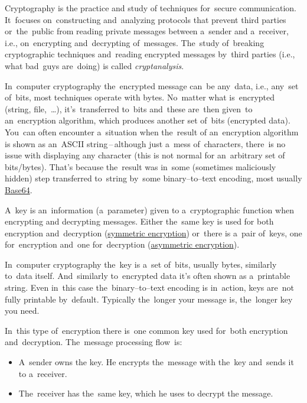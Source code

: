 Cryptography is the practice and study of techniques for~secure communication. It~focuses on~constructing and~analyzing protocols that prevent third parties or~the~public from reading private messages between a~sender and a~receiver, i.e., on~encrypting and~decrypting of~messages. The~study of~breaking cryptographic techniques and~reading encrypted messages by~third parties (i.e., what bad~guys are~doing) is called \textit{cryptanalysis}.

In~computer cryptography the~encrypted message can~be any~data, i.e., any~set of~bits, most techniques operate with bytes. No~matter what is~encrypted (string, file,~\dots), it's~transferred to~bits and~these are~then given~to an~encryption algorithm, which produces another set of~bits (encrypted data). You~can often encounter a~situation when the~result of an~encryption algorithm is shown as an~ASCII string\,--\,although just a~mess of~characters, there~is no issue with displaying any character (this is not normal for an~arbitrary set of bits/bytes). That's because the~result was in~some (sometimes maliciously hidden) step transferred to~string by~some binary--to--text encoding, most usually \hyperref[base64]{Base64}.

A~key is an~information (a~parameter) given to a~cryptographic function when encrypting and decrypting messages. Either the~same key is used for both encryption and~decryption (\hyperref[symmetricencryption]{symmetric encryption}) or~there is a~pair of~keys, one for~encryption and~one for~decryption (\hyperref[asymmetricencryption]{asymmetric encryption}).

In~computer cryptography the~key is a~set of~bits, usually bytes, similarly to~data itself. And~similarly to~encrypted data it's often shown as a~printable string. Even in~this case the~binary--to--text encoding is in~action, keys are~not fully printable by~default. Typically the~longer your message is, the~longer key you need.

\label{symmetricencryption}
In~this type of~encryption there is~one common key used for~both encryption and~decryption. The~message processing flow~is:
\begin{itemize}
    \item A~sender owns the key. He encrypts the~message with the~key and~sends it to a~receiver.
    \item The~receiver has the~same key, which he uses to decrypt the message.
\end{itemize}

